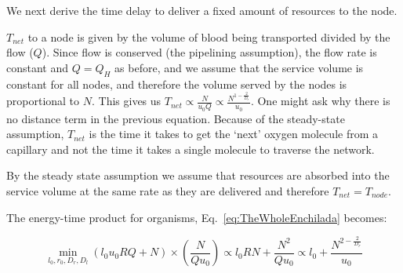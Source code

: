 \documentclass[12pt]{article}
\begin{document}

We next derive the time delay to deliver a fixed amount of resources to the
node. 

$T_{net}$ to a node is given by the volume of blood being transported divided
by the flow ($Q$). Since flow is conserved (the pipelining assumption), the
flow rate is constant and $Q = Q_H$ as before, and we assume that the service
volume is constant for all nodes, and therefore the volume served by the nodes
is proportional to $N$. This gives us $T_{net}\propto \frac{N}{ u_0 Q} \propto
\frac{N^{1-\frac{2}{D_r}}}{u_0}$.  One might ask why there is no distance term
in the previous equation.  Because of the steady-state assumption, $T_{net}$ is
the time it takes to get the `next' oxygen molecule from a capillary and not
the time it takes a single molecule to traverse the network.

By the steady state assumption we assume that resources are absorbed into the
service volume at the same rate as they are delivered and therefore
$T_{net}=T_{node}$.


The energy-time product for organisms, Eq.~\ref{eq:TheWholeEnchilada}
becomes:

\begin{equation}
  \min_{l_0,r_0,D_r,D_l} (l_0 u_0 RQ + N) \times (\frac{N}{Q u_0}) \propto l_0
  RN + \frac{N^2}{Q u_0}
  \propto l_0 + \frac{N^{2-\frac{2}{D_r}}}{u_0}
\label{eq:bio-min}
\end{equation}
\end{document}
